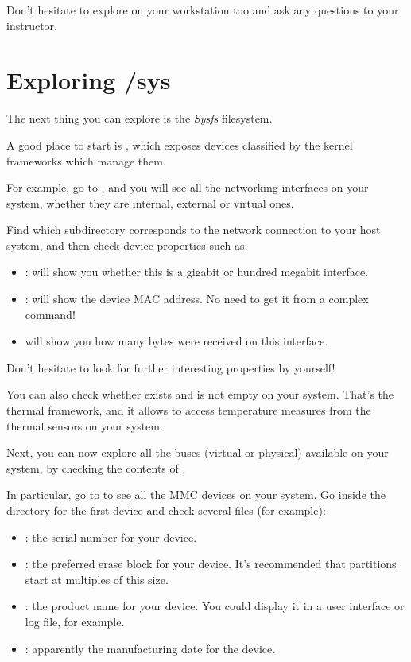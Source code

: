 Don't hesitate to explore  on your workstation too
and ask any questions to your instructor.

\section{Exploring /sys}

The next thing you can explore is the {\em Sysfs} filesystem.

A good place to start is , which exposes devices
classified by the kernel frameworks which manage them.

For example, go to , and you will see all the
networking interfaces on your system, whether they are internal,
external or virtual ones.

Find which subdirectory corresponds to the network connection
to your host system, and then check device properties such as:
\begin{itemize}
   \item {}: will show you whether this is a gigabit
         or hundred megabit interface.
   \item {}: will show the device MAC address. No
	 need to get it from a complex command!
   \item {} will show you how many bytes
	 were received on this interface.
\end{itemize}

Don't hesitate to look for further interesting properties by yourself!

You can also check whether  exists and is not
empty on your system. That's the thermal framework, and it allows
to access temperature measures from the thermal sensors on your system.

Next, you can now explore all the buses (virtual or physical) available
on your system, by checking the contents of .

In particular, go to  to see all the
MMC devices on your system. Go inside the directory for the first device
and check several files (for example):

\begin{itemize}
\item {}: the serial number for your device.
\item {}: the preferred erase block for your
      device. It's recommended that partitions start at multiples of this
      size.
\item {}: the product name for your device. You could display
      it in a user interface or log file, for example.
\item {}: apparently the manufacturing date for the device.
\end{itemize}

